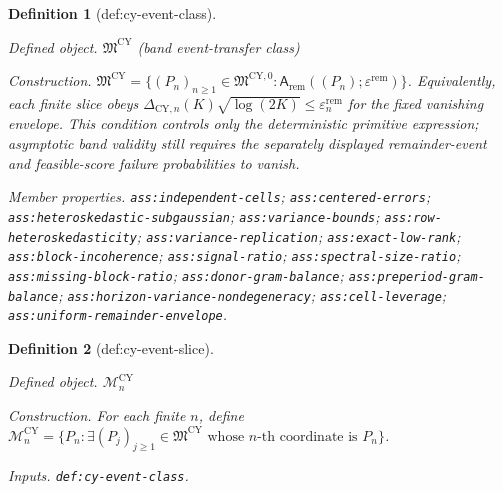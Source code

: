 \documentclass{article}
\newtheorem{definition}{Definition}
\begin{document}
\begin{definition}[def:cy-event-class]\label{def:cy-event-class}
\par\smallskip\noindent\emph{Defined object.} \(\mathfrak M^{\mathrm{CY}}\) (band event-transfer class)
\par\smallskip\noindent\emph{Construction.} \(\mathfrak M^{\mathrm{CY}}=\{(P_n)_{n\ge1}\in\mathfrak M^{\mathrm{CY},0}:\mathsf A_{\mathrm{rem}}((P_n);\varepsilon^{\mathrm{rem}})\}\). Equivalently, each finite slice obeys \(\Delta_{\mathrm{CY},n}(K)\sqrt{\log(2K)}\le\varepsilon_n^{\mathrm{rem}}\) for the fixed vanishing envelope.  This condition controls only the deterministic primitive expression; asymptotic band validity still requires the separately displayed remainder-event and feasible-score failure probabilities to vanish.
\par\smallskip\noindent\emph{Member properties.} \texttt{ass:\allowbreak{}independent-\allowbreak{}cells}; \texttt{ass:\allowbreak{}centered-\allowbreak{}errors}; \texttt{ass:\allowbreak{}heteroskedastic-\allowbreak{}subgaussian}; \texttt{ass:\allowbreak{}variance-\allowbreak{}bounds}; \texttt{ass:\allowbreak{}row-\allowbreak{}heteroskedasticity}; \texttt{ass:\allowbreak{}variance-\allowbreak{}replication}; \texttt{ass:\allowbreak{}exact-\allowbreak{}low-\allowbreak{}rank}; \texttt{ass:\allowbreak{}block-\allowbreak{}incoherence}; \texttt{ass:\allowbreak{}signal-\allowbreak{}ratio}; \texttt{ass:\allowbreak{}spectral-\allowbreak{}size-\allowbreak{}ratio}; \texttt{ass:\allowbreak{}missing-\allowbreak{}block-\allowbreak{}ratio}; \texttt{ass:\allowbreak{}donor-\allowbreak{}gram-\allowbreak{}balance}; \texttt{ass:\allowbreak{}preperiod-\allowbreak{}gram-\allowbreak{}balance}; \texttt{ass:\allowbreak{}horizon-\allowbreak{}variance-\allowbreak{}nondegeneracy}; \texttt{ass:\allowbreak{}cell-\allowbreak{}leverage}; \texttt{ass:\allowbreak{}uniform-\allowbreak{}remainder-\allowbreak{}envelope}.
\end{definition}

\begin{definition}[def:cy-event-slice]\label{def:cy-event-slice}
\par\smallskip\noindent\emph{Defined object.} \(\mathcal M_n^{\mathrm{CY}}\)
\par\smallskip\noindent\emph{Construction.} For each finite \(n\), define \(\mathcal M_n^{\mathrm{CY}}=\{P_n: \exists (P_j)_{j\ge1}\in\mathfrak M^{\mathrm{CY}}\text{ whose }n\text{-th coordinate is }P_n\}\).
\par\smallskip\noindent\emph{Inputs.} \texttt{def:\allowbreak{}cy-\allowbreak{}event-\allowbreak{}class}.
\end{definition}
\end{document}
